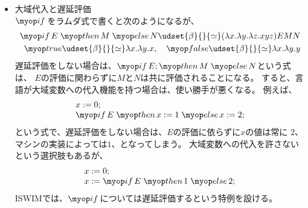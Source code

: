 {	\begin{itemize}\setlength{\itemsep}{-1mm} %
		\item 大域代入と遅延評価 \\
		$\qIf$をラムダ式で書くと次のようになるが、
		\begin{equation*}\begin{split}
			\qIf E\; \qThen M\; \qElse N 
			\udset{\beta}{}{\simeq} (\lmd{x}\lmd{y}\lmd{z} xyz) EMN \\
			\qTrue \udset{\beta}{}{\simeq} \lmd{x}\lmd{y}x,\quad
			\qFalse \udset{\beta}{}{\simeq} \lmd{x}\lmd{y}y
		\end{split}\end{equation*}
		遅延評価をしない場合は、$\qIf E;\qThen M\;\qElse N$という式は、
		$E$の評価に関わらずに$M$と$N$は共に評価されることになる。
		すると、言語が大域変数への代入機能を持つ場合は、使い勝手が悪くなる。
		例えば、
		\begin{equation*}\begin{array}{l}
			x := 0; \\
			\qIf E\;\qThen x:=1\;\qElse x:=2;
		\end{array}\end{equation*}
		という式で、遅延評価をしない場合は、$E$の評価に依らずに$x$の値は常に
		$2$、マシンの実装によっては$1$、となってしまう。
		大域変数への代入を許さないという選択肢もあるが、
		\begin{equation*}\begin{array}{l}
			x := 0; \\
			x := \qIf E\;\qThen 1\;\qElse 2;
		\end{array}\end{equation*}
		ISWIMでは、$\qIf$については遅延評価するという特例を設ける。
	\end{itemize} %
}
